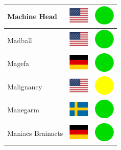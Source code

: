 \documentclass[12pt, a4paper, twoside]{report}
\begin{document}
\begin{center}
\begin{longtable}{|p{5cm}|p{2cm}|p{2cm}|}
Machine Head & \includegraphics[width=1cm]{4x3/us} & \includegraphics[width=1cm]{likes/y} \\ \hline
Madball & \includegraphics[width=1cm]{4x3/us} & \includegraphics[width=1cm]{likes/y} \\ \hline
Magefa & \includegraphics[width=1cm]{4x3/de} & \includegraphics[width=1cm]{likes/y} \\ \hline
Malignancy & \includegraphics[width=1cm]{4x3/us} & \includegraphics[width=1cm]{likes/m} \\ \hline
Manegarm & \includegraphics[width=1cm]{4x3/se} & \includegraphics[width=1cm]{likes/y} \\ \hline
Maniacs Brainacts & \includegraphics[width=1cm]{4x3/de} & \includegraphics[width=1cm]{likes/y} \\ \hline

\end{longtable}
\end{center}
\end{document}
